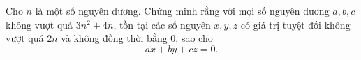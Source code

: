 \ifshowproblem
\begin{problem}\label{example:CHN-2015-TST1-P5}
	Cho \( n \) là một số nguyên dương. Chứng minh rằng với mọi số nguyên dương \( a, b, c \) không vượt quá \( 3n^2 + 4n \),
	tồn tại các số nguyên \( x, y, z \) có giá trị tuyệt đối không vượt quá \( 2n \) và không đồng thời bằng 0, sao cho
	\[
		ax + by + cz = 0.
	\]
\end{problem}
\fi

\footnotemark
{}
\fi